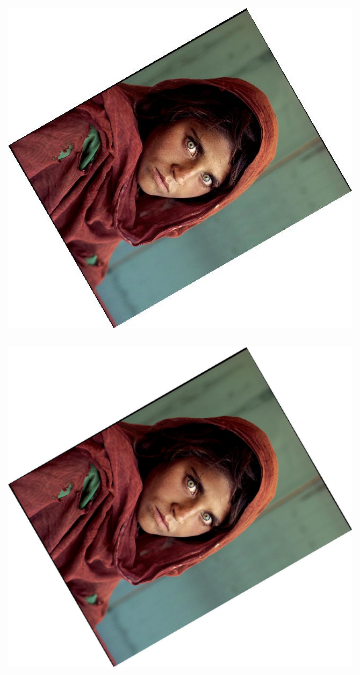 \documentclass{article}
\begin{document}
\begin{figure}[H]
    \centering
    \begin{subfigure}{.3\textwidth}
        \centering
        \includegraphics[scale=0.04]{q1/output/similar_d:_3_s:_0.5.jpg}
    \end{subfigure}
    \begin{subfigure}{.3\textwidth}
        \centering
        \includegraphics[scale=0.04]{q1/output/similar_d:_3_s:_1.jpg}

\end{subfigure}
\end{figure}
\end{document}
